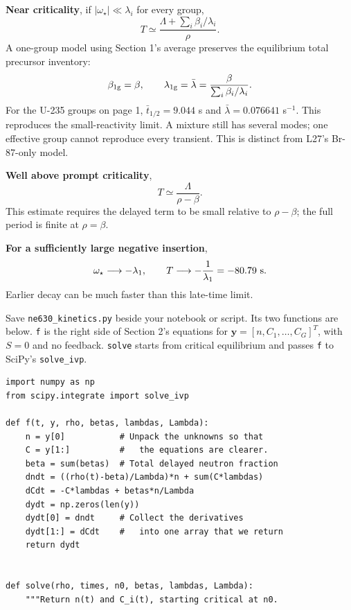 \documentclass[compact]{ne630handout}
\begin{document}
\clearpage
{}
\begin{handoutflow}



\textbf{Near criticality}, if $|\omega_\star|\ll\lambda_i$ for every group,
\[
 T\simeq\frac{\Lambda+\sum_i\beta_i/\lambda_i}{\rho}.
\]
A one-group model using Section 1's average preserves the equilibrium
total precursor inventory:
\[
 \beta_{\rm 1g}=\beta,\qquad
 \lambda_{\rm 1g}=\bar\lambda=\frac{\beta}{\sum_i\beta_i/\lambda_i}.
\]
For the U-235 groups on page 1, $\bar t_{1/2}=9.044$ s and
$\bar\lambda=0.076641$ s$^{-1}$. This reproduces the small-reactivity
limit. A mixture still has several modes; one effective group cannot
reproduce every transient. This is distinct from L27's Br-87-only model.

\textbf{Well above prompt criticality},
\[
 T\simeq\frac{\Lambda}{\rho-\beta}.
\]
This estimate requires the delayed term to be small relative to
$\rho-\beta$; the full period is finite at $\rho=\beta$.

\textbf{For a sufficiently large negative insertion},
\[
 \omega_\star\longrightarrow-\lambda_1,\qquad
 T\longrightarrow-\frac{1}{\lambda_1}=-80.79\ {\rm s}.
\]
Earlier decay can be much faster than this late-time limit.


Save \texttt{ne630\_kinetics.py} beside your notebook or script.
Its two functions are below. \texttt{f} is the right side of
Section 2's equations for $\mathbf y=[n,C_1,\ldots,C_G]^T$, with
$S=0$ and no feedback. \texttt{solve} starts from critical
equilibrium and passes \texttt{f} to SciPy's \texttt{solve\_ivp}.

\begin{lstlisting}[style=NEpython]
import numpy as np
from scipy.integrate import solve_ivp

def f(t, y, rho, betas, lambdas, Lambda):
    n = y[0]           # Unpack the unknowns so that
    C = y[1:]          #   the equations are clearer.
    beta = sum(betas)  # Total delayed neutron fraction
    dndt = ((rho(t)-beta)/Lambda)*n + sum(C*lambdas)
    dCdt = -C*lambdas + betas*n/Lambda
    dydt = np.zeros(len(y))
    dydt[0] = dndt     # Collect the derivatives
    dydt[1:] = dCdt    #   into one array that we return
    return dydt


def solve(rho, times, n0, betas, lambdas, Lambda):
    """Return n(t) and C_i(t), starting critical at n0.


\end{lstlisting}
\end{handoutflow}
\end{document}
